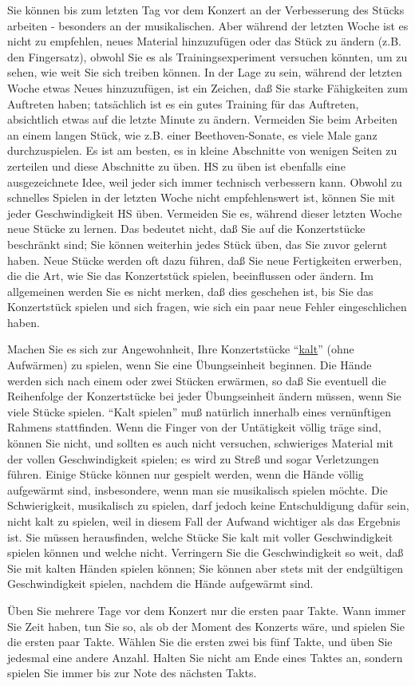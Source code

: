 Sie können bis zum letzten Tag vor dem Konzert an der Verbesserung des Stücks arbeiten - besonders an der musikalischen.
Aber während der letzten Woche ist es nicht zu empfehlen, neues Material hinzuzufügen oder das Stück zu ändern (z.B. den Fingersatz), obwohl Sie es als Trainingsexperiment versuchen könnten, um zu sehen, wie weit Sie sich treiben können.
In der Lage zu sein, während der letzten Woche etwas Neues hinzuzufügen, ist ein Zeichen, daß Sie starke Fähigkeiten zum Auftreten haben; tatsächlich ist es ein gutes Training für das Auftreten, absichtlich etwas auf die letzte Minute zu ändern.
Vermeiden Sie beim Arbeiten an einem langen Stück, wie z.B. einer Beethoven-Sonate, es viele Male ganz durchzuspielen.
Es ist am besten, es in kleine Abschnitte von wenigen Seiten zu zerteilen und diese Abschnitte zu üben.
HS zu üben ist ebenfalls eine ausgezeichnete Idee, weil jeder sich immer technisch verbessern kann.
Obwohl zu schnelles Spielen in der letzten Woche nicht empfehlenswert ist, können Sie mit jeder Geschwindigkeit HS üben.
Vermeiden Sie es, während dieser letzten Woche neue Stücke zu lernen.
Das bedeutet nicht, daß Sie auf die Konzertstücke beschränkt sind; Sie können weiterhin jedes Stück üben, das Sie zuvor gelernt haben.
Neue Stücke werden oft dazu führen, daß Sie neue Fertigkeiten erwerben, die die Art, wie Sie das Konzertstück spielen, beeinflussen oder ändern.
Im allgemeinen werden Sie es nicht merken, daß dies geschehen ist, bis Sie das Konzertstück spielen und sich fragen, wie sich ein paar neue Fehler eingeschlichen haben.

Machen Sie es sich zur Angewohnheit, Ihre Konzertstücke \enquote{\hyperref[c1iii6g]{kalt}} (ohne Aufwärmen) zu spielen, wenn Sie eine Übungseinheit beginnen.
Die Hände werden sich nach einem oder zwei Stücken erwärmen, so daß Sie eventuell die Reihenfolge der Konzertstücke bei jeder Übungseinheit ändern müssen, wenn Sie viele Stücke spielen.
\enquote{Kalt spielen} muß natürlich innerhalb eines vernünftigen Rahmens stattfinden.
Wenn die Finger von der Untätigkeit völlig träge sind, können Sie nicht, und sollten es auch nicht versuchen, schwieriges Material mit der vollen Geschwindigkeit spielen; es wird zu Streß und sogar Verletzungen führen.
Einige Stücke können nur gespielt werden, wenn die Hände völlig aufgewärmt sind,
insbesondere, wenn man sie musikalisch spielen möchte.
Die Schwierigkeit, musikalisch zu spielen, darf jedoch keine Entschuldigung dafür sein, nicht kalt zu spielen, weil in diesem Fall der Aufwand wichtiger als das Ergebnis ist.
Sie müssen herausfinden, welche Stücke Sie kalt mit voller Geschwindigkeit spielen können und welche nicht.
Verringern Sie die Geschwindigkeit so weit, daß Sie mit kalten Händen spielen können; Sie können aber stets mit der endgültigen Geschwindigkeit spielen, nachdem die Hände aufgewärmt sind. 

Üben Sie mehrere Tage vor dem Konzert nur die ersten paar Takte.
Wann immer Sie Zeit haben, tun Sie so, als ob der Moment des Konzerts wäre, und spielen Sie die ersten paar Takte. 
Wählen Sie die ersten zwei bis fünf Takte, und üben Sie jedesmal eine andere Anzahl.
Halten Sie nicht am Ende eines Taktes an, sondern spielen Sie immer bis zur Note des nächsten Takts.



